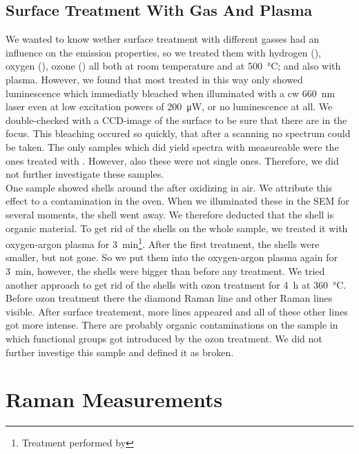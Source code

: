 			\subsection{Surface Treatment With Gas And Plasma}\label{subsection::plasma}

				We wanted to know wether surface treatment with different gasses had an influence on the emission properties, so we treated them with hydrogen (), oxygen (), ozone () all both at room temperature and at \SI{500}{\celsius}; and also with  plasma.
				However, we found that most \nds treated in this way only showed luminescence which immediatly bleached when illuminated with a cw \SI{660}{nm} laser even at low excitation powers of \SI{200}{\micro\watt}, or no luminescence at all.
				We double-checked with a CCD-image of the surface to be sure that there are \nds in the focus.
				This bleaching occured so quickly, that after a scanning no spectrum could be taken.
				The only samples which did yield spectra with measureable \ZPLs were the ones treated with .
				However, also these \sivs were not single ones.
				Therefore, we did not further investigate these samples.
				\\
				One sample showed shells around the \nd after oxidizing in air.
				We attribute this effect to a contamination in the oven.
				When we illuminated these \nds in the SEM for several moments, the shell went away.
				We therefore deducted that the shell is organic material.
				To get rid of the shells on the whole sample, we treated it with oxygen-argon plasma for \SI{3}{min}\footnote{Treatment performed by \schmauch}.
				After the first treatment, the shells were smaller, but not gone.
				So we put them into the oxygen-argon plasma again for \SI{3}{min}, however, the shells were bigger than before any treatment.
				We tried another approach to get rid of the shells with ozon treatment for \SI{4}{\hour} at \SI{360}{\celsius}.
				Before ozon treatment there the diamond Raman line and other Raman lines visible.
				After surface treatement, more lines appeared and all of these other lines got more intense.
				There are probably organic contaminations on the sample in which functional groups got introduced by the ozon treatment.
				We did not further investige this sample and defined it as broken.

		\section{Raman Measurements}

